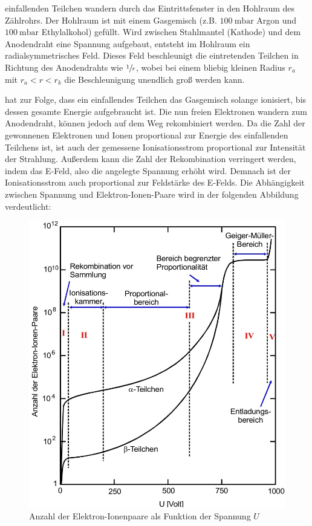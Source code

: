     \justifying einfallenden Teilchen wandern durch das Eintrittsfenster
    in den Hohlraum des Zählrohrs. Der Hohlraum ist mit einem Gasgemisch (z.B.
    $\SI{100}{\milli\bar}$ Argon und $\SI{100}{\milli\bar}$ Ethylalkohol) gefüllt. 
    Wird zwischen Stahlmantel (Kathode) und dem Anodendraht eine Spannung aufgebaut, 
    entsteht im Hohlraum ein radialsymmetrisches Feld. Dieses Feld beschleunigt die
    eintretenden Teilchen in Richtung des Anodendrahts wie $\sfrac{1}{r}$, wobei bei
    einem bliebig kleinen Radius $r_a$ mit $r_a < r < r_k$ die Beschleunigung unendlich
    groß werden kann. 

    \justifying hat zur Folge, dass ein einfallendes Teilchen das
    Gasgemisch solange ionisiert, bis dessen gesamte Energie aufgebraucht ist. Die
    nun freien Elektronen wandern zum Anodendraht, können jedoch auf dem Weg
    rekombiniert werden. Da die Zahl der gewonnenen Elektronen und Ionen proportional
    zur Energie des einfallenden Teilchens ist, ist auch der gemessene Ionisationsstrom
    proportional zur Intensität der Strahlung. Außerdem kann die Zahl der Rekombination 
    verringert werden, indem das E-Feld, also die angelegte Spannung erhöht wird. Demnach 
    ist der Ionisationsstrom auch proportional zur Feldstärke des E-Felds. Die Abhängigkeit 
    zwischen Spannung und Elektron-Ionen-Paare wird in der folgenden Abbildung verdeutlicht:

    \begin{figure}[H]
        \centering
        \includegraphics[width=0.75\linewidth]{images/Messbereich.jpg}
        \caption{Anzahl der Elektron-Ionenpaare als Funktion der Spannung $U$ \cite{V703}}
        \label{fig:2}
    \end{figure}

